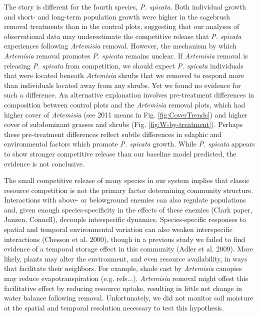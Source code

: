 \documentclass[11pt]{article}
\begin{document}
\begin{doublespacing}
The story is different for the fourth species, \textit{P. spicata}. Both individual growth and short- and long-term population growth were higher in the sagebrush removal treatments than in the control plots, suggesting that our analyses of observational data may underestimate the competitive release that \textit{P. spicata} experiences following \textit{Artemisia} removal. However, the mechanism by which \textit{Artemisia} removal promotes \textit{P. spicata} remains unclear. If  \textit{Artemisia} removal is releasing \textit{P. spicata} from competition, we should expect \textit{P. spicata} individuals that were located beneath \textit{Artemisia} shrubs that we removed to respond more than individuals located away from any shrubs. Yet we found no evidence for such a difference. An alternative explanation involves pre-treatment differences in composition between control plots and  the \textit{Artemisia} removal  plots, which had higher cover of \textit{Artemisia} (see 2011 means in Fig. \ref{fig:CoverTrends}) and higher cover of subdominant grasses and shrubs (Fig. \ref{fig:W-by-treatment}). Perhaps these pre-treatment differences reflect subtle differences in edaphic and environmental factors which promote \textit{P. spicata} growth. While \textit{P. spicata} appears to show stronger competitive release than our baseline model predicted, the evidence is not conclusive. 

The small competitive release of many species in our system implies that classic resource competition is not the primary factor determining community structure. Interactions with above- or belowground enemies can also regulate populations and, given enough species-specificity in the effects of these enemies (Clark paper, Janzen, Connell), decouple interspecific dynamics. Species-specific responses to spatial and temporal environmental variation can also weaken interspecific interactions (Chesson et al. 2000), though in a previous study we failed to find evidence of a temporal storage effect in this community (Adler et al. 2009). More likely, plants may alter the environment, and even resource availability, in ways that facilitate their neighbors. For example, shade cast by \textit{Artemisia} canopies may reduce evapotranspiration (e.g. refs...). \textit{Artemisia} removal might offest this facilitative effect by reducing resource uptake, resulting in little net change in water balance following removal.  Unfortunately, we did not monitor soil moisture at the spatial and temporal resolution necessary to test this hypothesis.


\end{doublespacing}
\end{document}
